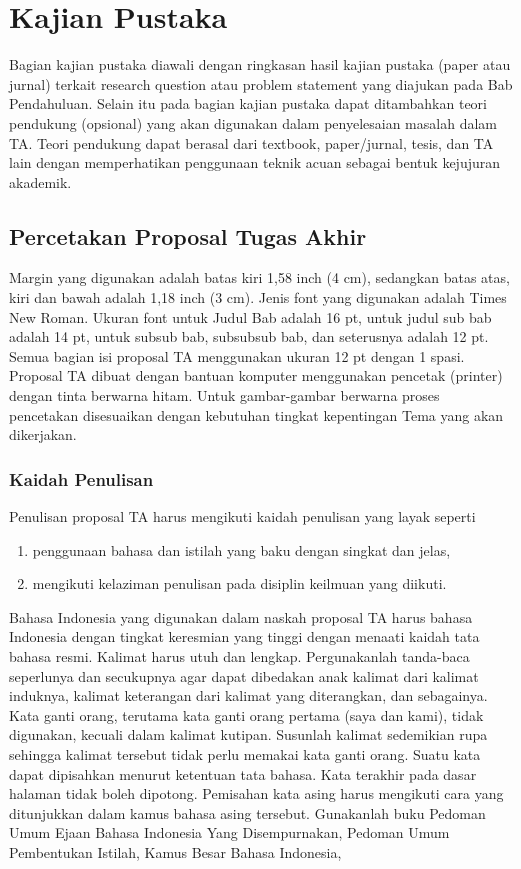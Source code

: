 \chapter{Kajian Pustaka}

Bagian kajian pustaka diawali dengan ringkasan hasil kajian pustaka (paper atau jurnal) terkait research question atau problem statement yang diajukan pada Bab Pendahuluan. Selain itu pada bagian kajian pustaka dapat ditambahkan teori pendukung (opsional) yang akan digunakan dalam penyelesaian masalah dalam TA. Teori pendukung dapat berasal dari textbook, paper/jurnal, tesis, dan TA lain dengan memperhatikan penggunaan teknik acuan sebagai bentuk kejujuran akademik. 

\section{Percetakan Proposal Tugas Akhir  }
Margin yang digunakan adalah batas kiri 1,58 inch (4 cm), sedangkan batas atas, kiri dan bawah adalah 1,18 inch (3 cm). Jenis font yang digunakan adalah Times New Roman. Ukuran font untuk Judul Bab adalah 16 pt, untuk judul sub bab adalah 14 pt, untuk subsub bab, subsubsub bab, dan seterusnya adalah 12 pt. Semua bagian isi proposal TA menggunakan ukuran 12 pt dengan 1 spasi. 
Proposal TA dibuat dengan bantuan komputer menggunakan pencetak (printer) dengan tinta berwarna hitam. Untuk gambar-gambar berwarna proses pencetakan disesuaikan dengan kebutuhan tingkat kepentingan Tema yang akan dikerjakan. 

\subsection{Kaidah Penulisan}

Penulisan proposal TA harus mengikuti kaidah penulisan yang layak seperti 
\begin{enumerate}
    \item penggunaan bahasa dan istilah yang baku dengan singkat dan jelas,
    \item mengikuti kelaziman penulisan pada disiplin keilmuan yang diikuti.
\end{enumerate}
Bahasa Indonesia yang digunakan dalam naskah proposal TA harus bahasa Indonesia dengan tingkat keresmian yang tinggi dengan menaati kaidah tata bahasa resmi. Kalimat harus utuh dan lengkap. Pergunakanlah tanda-baca seperlunya dan secukupnya agar dapat dibedakan anak kalimat dari kalimat induknya, kalimat keterangan dari kalimat yang diterangkan, dan sebagainya. 
Kata ganti orang, terutama kata ganti orang pertama (saya dan kami), tidak digunakan, kecuali dalam kalimat kutipan. Susunlah kalimat sedemikian rupa sehingga kalimat tersebut tidak perlu memakai kata ganti orang. Suatu kata dapat dipisahkan menurut ketentuan tata bahasa. Kata terakhir pada dasar halaman tidak boleh dipotong. Pemisahan kata asing harus mengikuti cara yang ditunjukkan dalam kamus bahasa asing tersebut. Gunakanlah buku Pedoman Umum Ejaan Bahasa Indonesia Yang Disempurnakan, Pedoman Umum Pembentukan Istilah, Kamus Besar Bahasa Indonesia, 



